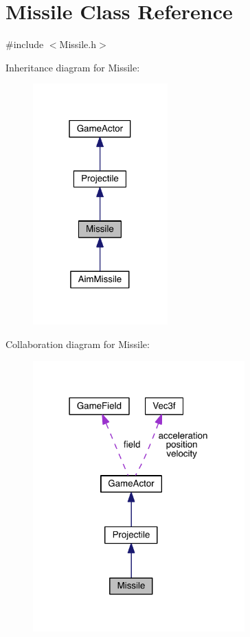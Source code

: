 \hypertarget{class_missile}{\section{Missile Class Reference}
\label{class_missile}
}


{\ttfamily \#include $<$Missile.\+h$>$}



Inheritance diagram for Missile\+:\nopagebreak
\begin{figure}[H]
\begin{center}
\leavevmode
\includegraphics[width=147pt]{class_missile__inherit__graph}
\end{center}
\end{figure}


Collaboration diagram for Missile\+:\nopagebreak
\begin{figure}[H]
\begin{center}
\leavevmode
\includegraphics[width=231pt]{class_missile__coll__graph}
\end{center}
\end{figure}
